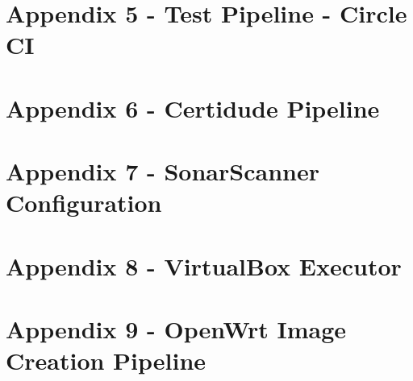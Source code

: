 \documentclass[12pt, a4paper]{report}
\begin{document}
\clearpage
{}
{}\label{chapter:appendix-circleci}
\chapter*{Appendix 5 - Test Pipeline - Circle CI}


\clearpage
{}
{}\label{chapter:appendix-certidude-pipeline}
\chapter*{Appendix 6 - Certidude Pipeline}


{}\label{chapter:appendix-sonar}
{\let\clearpage\relax\chapter*{Appendix 7 - SonarScanner Configuration}}


\clearpage
{}
{}\label{chapter:appendix-vbox}
\chapter*{Appendix 8 - VirtualBox Executor}


\clearpage
{}
{}\label{chapter:appendix-openwrt}
\chapter*{Appendix 9 - OpenWrt Image Creation Pipeline}

\end{document}
